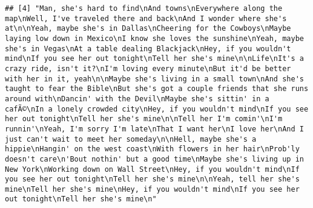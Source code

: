 \documentclass[]{article}
\begin{document}
\begin{verbatim}
## [4] "Man, she's hard to find\nAnd towns\nEverywhere along the map\nWell, I've traveled there and back\nAnd I wonder where she's at\n\nYeah, maybe she's in Dallas\nCheering for the Cowboys\nMaybe laying low down in Mexico\nI know she loves the sunshine\nYeah, maybe she's in Vegas\nAt a table dealing Blackjack\nHey, if you wouldn't mind\nIf you see her out tonight\nTell her she's mine\n\nLife\nIt's a crazy ride, isn't it?\nI'm loving every minute\nBut it'd be better with her in it, yeah\n\nMaybe she's living in a small town\nAnd she's taught to fear the Bible\nBut she's got a couple friends that she runs around with\nDancin' with the Devil\nMaybe she's sittin' in a cafÃ©\nIn a lonely crowded city\nHey, if you wouldn't mind\nIf you see her out tonight\nTell her she's mine\n\nTell her I'm comin'\nI'm runnin'\nYeah, I'm sorry I'm late\nThat I want her\nI love her\nAnd I just can't wait to meet her someday\n\nHell, maybe she's a hippie\nHangin' on the west coast\nWith flowers in her hair\nProb'ly doesn't care\n'Bout nothin' but a good time\nMaybe she's living up in New York\nWorking down on Wall Street\nHey, if you wouldn't mind\nIf you see her out tonight\nTell her she's mine\n\nYeah, tell her she's mine\nTell her she's mine\nHey, if you wouldn't mind\nIf you see her out tonight\nTell her she's mine\n"                                                                                                                                                                                                                                                                                                                                                                                             

\end{verbatim}
\end{document}
